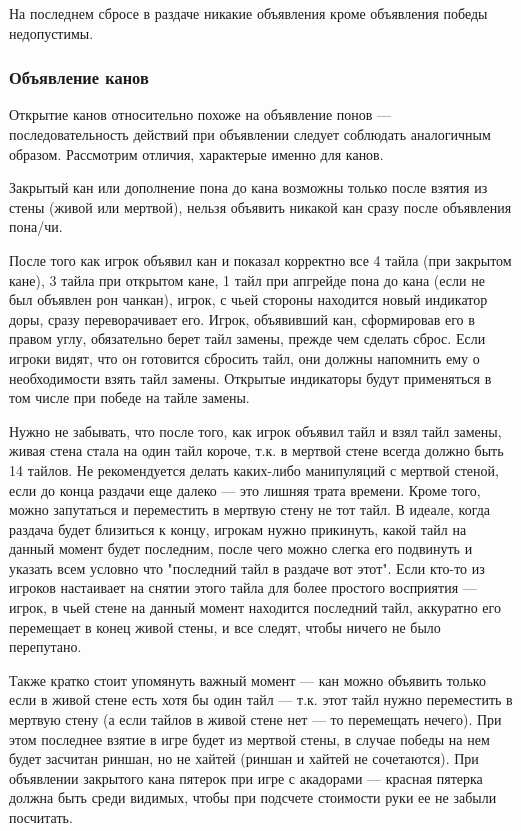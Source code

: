 На последнем сбросе в раздаче никакие объявления кроме объявления победы недопустимы.

\subsubsection{Объявление канов}

Открытие канов относительно похоже на объявление понов --- последовательность действий при объявлении следует соблюдать аналогичным образом. Рассмотрим отличия, характерые именно для канов.

Закрытый кан или дополнение пона до кана возможны только после взятия из стены (живой или мертвой), нельзя объявить никакой кан сразу после объявления пона/чи.

После того как игрок объявил кан и показал корректно все 4 тайла (при закрытом кане), 3 тайла при открытом кане, 1 тайл при апгрейде пона до кана (если не был объявлен рон чанкан), игрок, с чьей стороны находится новый индикатор доры, сразу переворачивает его. Игрок, объявивший кан, сформировав его в правом углу, обязательно берет тайл замены, прежде чем сделать сброс. Если игроки видят, что он готовится сбросить тайл, они должны напомнить ему о необходимости взять тайл замены. Открытые индикаторы будут применяться в том числе при победе на тайле замены.

Нужно не забывать, что после того, как игрок объявил тайл и взял тайл замены, живая стена стала на один тайл короче, т.к. в мертвой стене всегда должно быть 14 тайлов. Не рекомендуется делать каких-либо манипуляций с мертвой стеной, если до конца раздачи еще далеко --- это лишняя трата времени. Кроме того, можно запутаться и переместить в мертвую стену не тот тайл. В идеале, когда раздача будет близиться к концу, игрокам нужно прикинуть, какой тайл на данный момент будет последним, после чего можно слегка его подвинуть и указать всем условно что "последний тайл в раздаче вот этот". Если кто-то из игроков настаивает на снятии этого тайла для более простого восприятия --- игрок, в чьей стене на данный момент находится последний тайл, аккуратно его перемещает в конец живой стены, и все следят, чтобы ничего не было перепутано.

Также кратко стоит упомянуть важный момент --- кан можно объявить только если в живой стене есть хотя бы один тайл --- т.к. этот тайл нужно переместить в мертвую стену (а если тайлов в живой стене нет --- то перемещать нечего). При этом последнее взятие в игре будет из мертвой стены, в случае победы на нем будет засчитан риншан, но не хайтей (риншан и хайтей не сочетаются). При объявлении закрытого кана пятерок при игре с акадорами --- красная пятерка должна быть среди видимых, чтобы при подсчете стоимости руки ее не забыли посчитать.

